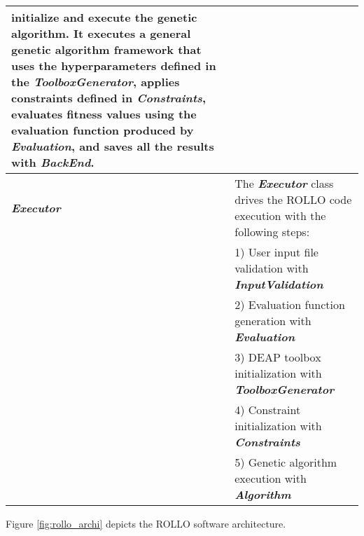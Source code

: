 \begin{table}[htbp]
\begin{tabular}{l|p{}}
    initialize and execute the genetic algorithm. It executes a general genetic 
    algorithm framework that uses the hyperparameters defined in the 
    \textbf{\textit{ToolboxGenerator}}, applies constraints defined in
    \textbf{\textit{Constraints}}, evaluates fitness values using the evaluation 
    function produced by \textbf{\textit{Evaluation}}, and saves all the results 
    with \textbf{\textit{BackEnd}}. \\
    \hline
    \textbf{\textit{Executor}} & The \textbf{\textit{Executor}} class drives the \gls{ROLLO} code
    execution with the following steps: \\
    & 1) User input file validation with \textbf{\textit{InputValidation}} \\
    & 2) Evaluation function generation with \textbf{\textit{Evaluation}} \\
    & 3) \gls{DEAP} toolbox initialization with \textbf{\textit{ToolboxGenerator}} \\ 
    & 4) Constraint initialization with \textbf{\textit{Constraints}} \\ 
    & 5) Genetic algorithm execution with \textbf{\textit{Algorithm}} \\
    \hline
    \end{tabular}
    \end{table}
Figure \ref{fig:rollo_archi} depicts the \gls{ROLLO} software architecture. 
